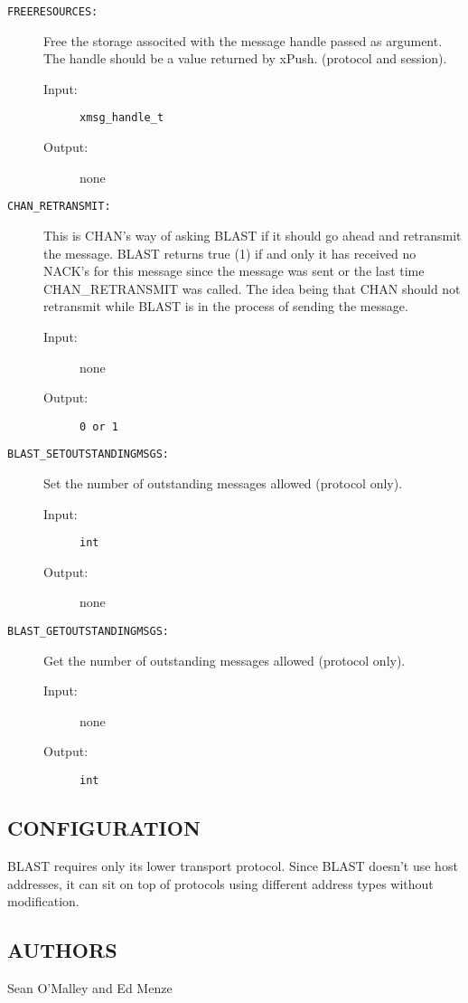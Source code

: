 \begin{description}

\item[{\tt FREERESOURCES:}]
Free the storage associted with the message handle passed as 
argument. The handle should be a value returned by xPush. 
(protocol and session).
\begin{description}
\item[{\rm Input:}] {\tt xmsg\_handle\_t} 
\item[{\rm Output:}] none
\end{description}

\item[{\tt CHAN\_RETRANSMIT:}]
This is CHAN's way of asking BLAST if it should go ahead and retransmit
the message. BLAST returns true (1)  if and only it has received no 
NACK's for this message since the message was sent or the last time 
CHAN\_RETRANSMIT was called. The idea being that CHAN should not 
retransmit while BLAST is in the process of sending the message.
\begin{description}
\item[{\rm Input:}] none
\item[{\rm Output:}] {\tt 0 or 1} 
\end{description}

\item[{\tt BLAST\_SETOUTSTANDINGMSGS:}]
Set the number of outstanding messages allowed (protocol only).
\begin{description}
\item[{\rm Input:}] {\tt int} 
\item[{\rm Output:}] none
\end{description}

\item[{\tt BLAST\_GETOUTSTANDINGMSGS:}]
Get the number of outstanding messages allowed (protocol only).
\begin{description}
\item[{\rm Input:}]  none
\item[{\rm Output:}] {\tt int} 
\end{description}

\end{description}

\subsection*{CONFIGURATION}

BLAST requires only its lower transport protocol.  Since BLAST doesn't
use host addresses, it can sit on top of protocols using different
address types without modification.

\subsection*{AUTHORS}

\noindent Sean O'Malley and Ed Menze



